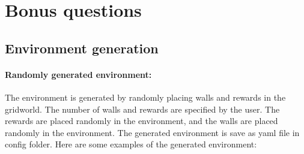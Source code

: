 \documentclass{article}
\begin{document}
\section{Bonus questions}

\subsection{Environment generation}

\paragraph{Randomly generated environment:} The environment is generated by randomly placing walls and rewards in the gridworld. The number of walls and rewards are specified by the user. The rewards are placed randomly in the environment, and the walls are placed randomly in the environment. The generated environment is save as yaml file in config folder. Here are some examples of the generated environment:
\end{document}
